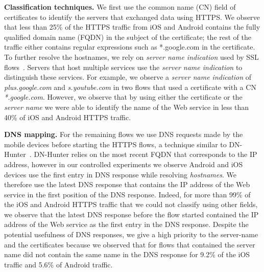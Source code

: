 
\noindent\textbf{Classification techniques.} We first use the common name (CN) field of certificates to identify the servers that exchanged data using HTTPS.
We observe that less than 25\% of the HTTPS traffic from iOS and Android contains the fully qualified domain name (FQDN) in the subject of the certificate; the rest of the traffic either contains regular expressions such as *.google.com in the certificate.
To further resolve the hostnames, we rely on \emph{server name indication} used by SSL flows~\cite{rfc:servernametls}.
Servers that host multiple services use the \emph{server name indication} to distinguish these services.   
For example, we observe a \emph{server name indication} of \emph{plus.google.com} and \emph{s.youtube.com} in two flows that used a certificate with a CN \emph{*.google.com}.
However, we observe that by using either the certificate or the \emph{server name} we were able to identify the name of the Web service in less than 40\% of iOS and Android HTTPS traffic.

\noindent\textbf{DNS mapping.} For the remaining flows we use DNS requests made by the mobile devices before starting the HTTPS flows, a technique similar to DN-Hunter~\cite{bermudez:dnhunter}.
DN-Hunter relies on the most recent FQDN that corresponds to the IP address, however in our controlled experiments we observe Android and iOS devices use the first entry in DNS response while resolving \emph{hostnames}.
We therefore use the latest DNS response that contains the IP address of the Web service in the first position of the DNS response. 
Indeed, for more than 99\% of the iOS and Android HTTPS traffic that we could not classify using other fields, we observe that the latest DNS response before the flow started contained the IP address of the Web service as the first entry in the DNS response.
Despite the potential usefulness of DNS responses, we give a high priority to the server-name and the certificates because we observed that for flows that contained the server name did not contain the same name in the DNS response for 9.2\% of the iOS traffic and 5.6\% of Android traffic.

